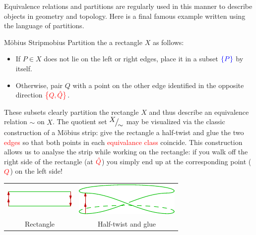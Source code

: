 

\goodbreak


Equivalence relations and partitions are regularly used in this manner to describe objects in geometry and topology. Here is a final famous example written using the language of partitions. 

\begin{example}{Möbius Strip}{mobius}
	Partition the a rectangle $X$ as follows:
	\begin{itemize}
		\item If $P\in X$ does not lie on the left or right edges, place it in a subset $\textcolor{blue}{\{P\}}$ by itself.
		\item Otherwise, pair $Q$ with a point on the other edge identified in the opposite direction $\textcolor{red}{\bigl\{Q,\hat Q\bigr\}}$.
	\end{itemize}
	These subsets clearly partition the rectangle $X$ and thus describe an equivalence relation $\sim$ on $X$. The quotient set ${}^{\textstyle {X}}\!\big/_{\textstyle \!{\sim}}$ may be visualized via the classic construction of a Möbius strip: give the rectangle a half-twist and glue the two \textcolor{red}{edges} so that both points in each \textcolor{red}{equivalance class} coincide. This construction allows us to analyse the strip while working on the rectangle: if you walk off the right side of the rectangle (at $\textcolor{red}{\hat Q}$) you simply end up at the corresponding point ($\textcolor{red}{Q}$) on the left side!

\begin{center}
	\begin{tabular}{c@{\quad}c}
		\includegraphics{relations-10-mobius}
		&
		\includegraphics{relations-12-mobius}
		\\
		Rectangle
		&
		Half-twist and glue
	\end{tabular}
\end{center}


\end{example}
